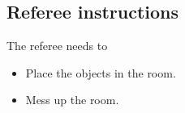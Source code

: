 \subsection{Referee instructions}
The referee needs to
\begin{itemize}
	\item Place the objects in the room.
	\item Mess up the room.
\end{itemize}
